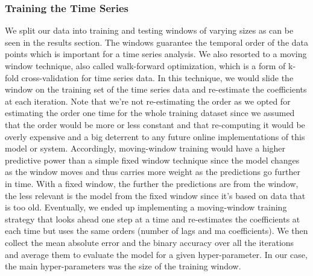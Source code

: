 \subsubsection{Training the Time Series}
We split our data into training and testing windows of varying sizes as can be seen in the results section. The windows guarantee the temporal order of the data points which is important for a time series analysis. We also resorted to a moving window technique, also called walk-forward optimization, which is a form of k-fold cross-validation for time series data. In this technique, we would slide the window on the training set of the time series data and re-estimate the coefficients at each iteration. Note that we're not re-estimating the order as we opted for estimating the order one time for the whole training dataset since we assumed that the order would be more or less constant and that re-computing it would be overly expensive and a big deterrent to any future online implementations of this model or system. 
Accordingly, moving-window training would have a higher predictive power than a simple fixed window technique since the model changes as the window moves and thus carries more weight as the predictions go further in time. With a fixed window, the further the predictions are from the window, the less relevant is the model from the fixed window since it's based on data that is too old. %
Eventually, we ended up implementing a moving-window training strategy that looks ahead one step at a time and re-estimates the coefficients at each time but uses the same orders (number of lags and ma coefficients). We then collect the mean absolute error and the binary accuracy over all the iterations and average them to evaluate the model for a given hyper-parameter. In our case, the main hyper-parameters was the size of the training window.

